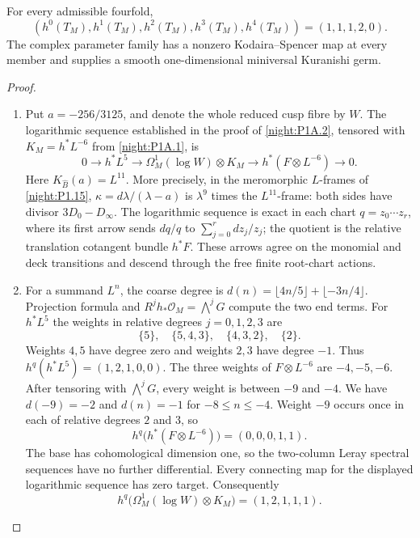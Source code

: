 \begin{theorem}\hypertarget{tag-02R3}{}\label{night:P1A.3}
For every admissible fourfold,
\[
 (h^0(T_M),h^1(T_M),h^2(T_M),h^3(T_M),h^4(T_M))
 =(1,1,1,2,0).
\]
The complex parameter family has a nonzero Kodaira--Spencer map
at every member and supplies a smooth one-dimensional miniversal
Kuranishi germ.
\end{theorem}
\begin{proof}
\begin{enumerate}[label={$\langle1\rangle$\arabic*.}]
\item Put $a=-256/3125$, and denote the whole reduced cusp fibre by
$W$.  The logarithmic sequence established in the proof of
\cref{night:P1A.2}, tensored with $K_M=h^*L^{-6}$ from
\cref{night:P1A.1}, is
\[
0\longrightarrow h^*L^5
\longrightarrow\Omega^1_M(\log W)\otimes K_M
\longrightarrow h^*(F\otimes L^{-6})\longrightarrow0.
\]
Here $K_{\widehat B}(a)=L^{11}$.  More precisely, in the meromorphic
$L$-frames of \cref{night:P1.15},
$\kappa=d\lambda/(\lambda-a)$ is $\lambda^9$ times the
$L^{11}$-frame: both sides have divisor $3D_0-D_\infty$.
The logarithmic sequence is exact in each chart
$q=z_0\cdots z_r$, where its first arrow sends $dq/q$ to
$\sum_{j=0}^r dz_j/z_j$; the quotient is the relative translation
cotangent bundle $h^*F$.  These arrows agree on the monomial and deck transitions and descend through the free finite
root-chart actions.

\item For a summand $L^n$, the coarse degree is
$d(n)=\lfloor4n/5\rfloor+\lfloor-3n/4\rfloor$.
Projection formula and
$R^jh_*\mathcal O_M=\bigwedge^jG$ compute the two end terms.
For $h^*L^5$ the weights in relative degrees $j=0,1,2,3$ are
\[
\{5\},\quad\{5,4,3\},\quad\{4,3,2\},\quad\{2\}.
\]
Weights $4,5$ have degree zero and weights $2,3$ have degree $-1$.
Thus $h^q(h^*L^5)=(1,2,1,0,0)$.
The three weights of $F\otimes L^{-6}$ are $-4,-5,-6$.
After tensoring with $\bigwedge^jG$, every weight is between
$-9$ and $-4$.  We have $d(-9)=-2$ and $d(n)=-1$ for
$-8\le n\le-4$.  Weight $-9$ occurs once in each of relative
degrees $2$ and $3$, so
\[
h^q\bigl(h^*(F\otimes L^{-6})\bigr)=(0,0,0,1,1).
\]
The base has cohomological dimension one, so the two-column Leray
spectral sequences have no further differential.  Every connecting
map for the displayed logarithmic sequence has zero target.
Consequently
\[
h^q\bigl(\Omega^1_M(\log W)\otimes K_M\bigr)=(1,2,1,1,1).
\]


\end{enumerate}
\end{proof}
